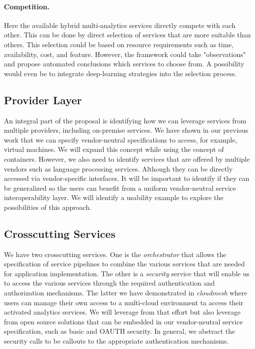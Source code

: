 \paragraph{Competition.} Here the available hybrid multi-analytics services
directly compete with each other. This can be done by direct selection
of services that are more suitable than others. This selection could
be based on resource requirements such as time, availability, cost,
and feature. However, the framework could take "observations" and
propose automated conclusions which services to choose from. A
possibility would even be to integrate deep-learning strategies into
the selection process.
  

\subsection{Provider Layer}

An integral part of the proposal is identifying how we can leverage
services from multiple providers, including on-premise services. We
have shown in our previous work that we can specify vendor-neutral
specifications to access, for example, virtual machines. We will expand
this concept while using the concept of containers. However, we also
need to identify services that are offered by
multiple vendors such as language processing services. Although they
can be directly accessed via vendor-specific interfaces. It will
be important to identify if they can be generalized so the users
can benefit from a uniform vendor-neutral service interoperability
layer. We will identify a usability example to explore the
possibilities of this approach.

\subsection{Crosscutting Services}

We have two crosscutting services. One is the {\em orchestrator} that
allows the specification of service pipelines to combine the various
services that are needed for application implementation. The other
is a {\em security} service that will enable us to access the various services
through the required authentication and authorization mechanisms. The
latter we have demonstrated in {\em cloudmesh} where users can manage their
own access to a multi-cloud environment ta access their activated
analytics services. We will leverage from that effort but  also leverage from
open source solutions that can be embedded in our vendor-neutral
service specification, such as basic and OAUTH security. In general, we
abstract the security calls to be callouts to the appropriate
authentication mechanisms.

